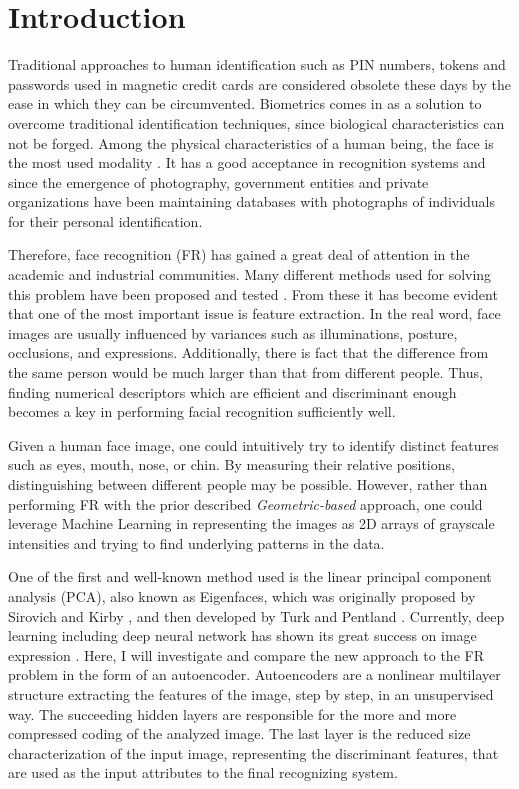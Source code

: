 \section{Introduction}

Traditional approaches to human identification such as PIN numbers, tokens and
passwords used in magnetic credit cards are considered obsolete these days by
the ease in which they can be circumvented. Biometrics comes in as a solution to
overcome traditional identification techniques, since biological characteristics
can not be forged. Among the physical characteristics of a human being, the face
is the most used modality \cite{delac2004survey}. It has a good acceptance in
recognition systems and since the emergence of photography, government entities
and private organizations have been maintaining databases with photographs of
individuals for their personal identification.

Therefore, face recognition (FR) has gained a great deal of attention in the
academic and industrial communities. Many different methods used for solving
this problem have been proposed and tested
\cite{turk1991eigenfaces,sirovich1987low,belhumeur1997eigenfaces}. From these it
has become evident that one of the most important issue is feature extraction.
In the real word, face images are usually influenced by variances such as
illuminations, posture, occlusions, and expressions. Additionally, there is fact
that the difference from the same person would be much larger than that from
different people. Thus, finding numerical descriptors which are efficient and
discriminant enough becomes a key in performing facial recognition sufficiently
well.

Given a human face image, one could intuitively try to identify distinct
features such as eyes, mouth, nose, or chin. By measuring their relative
positions, distinguishing between different people may be possible. However,
rather than performing FR with the prior described \textit{Geometric-based}
approach, one could leverage Machine Learning in representing the images as 2D
arrays of grayscale intensities and trying to find underlying patterns in the
data. 

One of the first and well-known method used is the linear principal component
analysis (PCA), also known as Eigenfaces, which was originally proposed by
Sirovich and Kirby \cite{sirovich1987low}, and then developed by Turk and
Pentland \cite{turk1991eigenfaces}. Currently, deep learning including deep
neural network has shown its great success on image expression
\cite{krizhevsky2012imagenet}. Here, I will investigate and compare the new
approach to the FR problem in the form of an autoencoder. Autoencoders are a
nonlinear multilayer structure extracting the features of the image, step by
step, in an unsupervised way. The succeeding hidden layers are responsible for
the more and more compressed coding of the analyzed image. The last layer is the
reduced size characterization of the input image, representing the discriminant
features, that are used as the input attributes to the final recognizing system.

